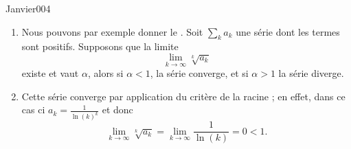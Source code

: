 \begin{corrige}{Janvier004}


\begin{enumerate}
  \item
Nous pouvons par exemple donner le .
 Soit $\sum_k a_k$ une série dont les termes sont
  positifs. Supposons que la limite
  \begin{equation*}
    \lim_{k \to \infty} \sqrt[k]{a_k}
  \end{equation*}
  existe et vaut $\alpha$, alors si $\alpha < 1$, la
  série converge, et si $\alpha > 1$ la série diverge.

\item Cette série converge par application du critère de la racine ;
  en effet, dans ce cas ci $a_k = \frac 1 {\ln(k)^k}$ et donc
  \begin{equation*}
    \lim_{k\to\infty} \sqrt[k]{a_k} = \lim_{k\to\infty} \frac 1
    {\ln(k)} = 0 < 1.
  \end{equation*}
\end{enumerate}

\end{corrige}
